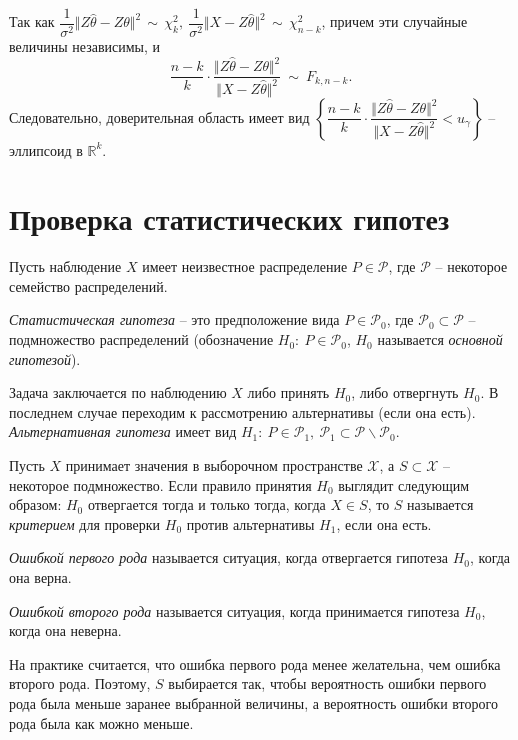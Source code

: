 Так как $\displaystyle \dfrac{1}{\sigma ^{2}}\Vert Z\hat{\theta } -Z\theta \Vert ^{2} \, \sim \, \chi _{k}^{2} ,\ \dfrac{1}{\sigma ^{2}}\Vert X-Z\hat{\theta }\Vert ^{2} \, \sim \, \chi _{n-k}^{2}$, причем эти случайные величины независимы, и
\begin{equation*}
    \dfrac{n-k}{k} \cdotp \dfrac{\Vert Z\hat{\theta } -Z\theta \Vert ^{2}}{\Vert X-Z\hat{\theta }\Vert ^{2}} \ \sim \ F_{k,n-k} .
\end{equation*}
Следовательно, доверительная область имеет вид $\displaystyle \left\{\dfrac{n-k}{k} \cdotp \dfrac{\Vert Z\hat{\theta } -Z\theta \Vert ^{2}}{\Vert X-Z\hat{\theta }\Vert ^{2}} < u_{\gamma }\right\}$ -- эллипсоид в $\displaystyle \mathbb{R}^{k}$.
\section{Проверка статистических гипотез}

Пусть наблюдение $\displaystyle X$ имеет неизвестное распределение $\displaystyle P\in \mathcal{P}$, где $\displaystyle \mathcal{P}$ -- некоторое семейство распределений.
\begin{definition}
    \textit{Статистическая гипотеза} -- это предположение вида $\displaystyle P\in \mathcal{P}_{0}$, где $\displaystyle \mathcal{P}_{0} \subset \mathcal{P}$ -- подмножество распределений (обозначение $\displaystyle H_{0} :\ P\in \mathcal{P}_{0}$, $\displaystyle H_{0}$ называется \textit{основной гипотезой}).
\end{definition}
Задача заключается по наблюдению $\displaystyle X$ либо принять $\displaystyle H_{0}$, либо отвергнуть $\displaystyle H_{0}$. В последнем случае переходим к рассмотрению альтернативы (если она есть). \textit{Альтернативная гипотеза} имеет вид $\displaystyle H_{1} :\ P\in \mathcal{P}_{1} ,\ \mathcal{P}_{1} \subset \mathcal{P} \backslash \mathcal{P}_{0}$.
\begin{definition}
    Пусть $\displaystyle X$ принимает значения в выборочном пространстве $\displaystyle \mathcal{X}$, а $\displaystyle S\subset \mathcal{X}$ -- некоторое подмножество. Если правило принятия $\displaystyle H_{0}$ выглядит следующим образом: $\displaystyle H_{0}$ отвергается тогда и только тогда, когда $\displaystyle X\in S$, то $\displaystyle S$ называется \textit{критерием} для проверки $\displaystyle H_{0}$ против альтернативы $\displaystyle H_{1}$, если она есть.
\end{definition}
\begin{definition}
    \textit{Ошибкой первого рода} называется ситуация, когда отвергается гипотеза $\displaystyle H_{0}$, когда она верна.
\end{definition}
\begin{definition}
    \textit{Ошибкой второго рода} называется ситуация, когда принимается гипотеза $\displaystyle H_{0}$, когда она неверна.
\end{definition}
\begin{note}
    На практике считается, что ошибка первого рода менее желательна, чем ошибка второго рода. Поэтому, $\displaystyle S$ выбирается так, чтобы вероятность ошибки первого рода была меньше заранее выбранной величины, а вероятность ошибки второго рода была как можно меньше.
\end{note}
